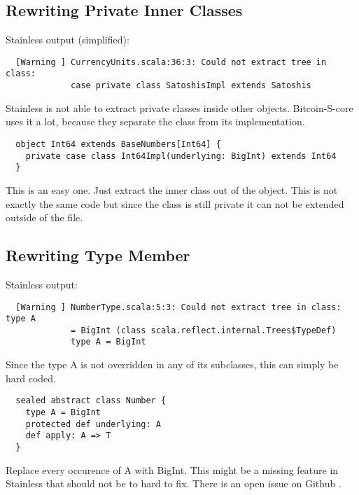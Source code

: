 \subsection{Rewriting Private Inner Classes}
Stainless output (simplified):
\begin{lstlisting}
  [Warning ] CurrencyUnits.scala:36:3: Could not extract tree in class:
             case private class SatoshisImpl extends Satoshis
\end{lstlisting}
Stainless is not able to extract private classes inside other objects.
Bitcoin-S-core uses it a lot, because they separate the class from its implementation.
\begin{lstlisting}
  object Int64 extends BaseNumbers[Int64] {
    private case class Int64Impl(underlying: BigInt) extends Int64 
  }
\end{lstlisting}
This is an easy one.
Just extract the inner class out of the object.
This is not exactly the same code but since the class is still private it can not be extended outside of the file.

\subsection{Rewriting Type Member}
Stainless output:
\begin{lstlisting}
  [Warning ] NumberType.scala:5:3: Could not extract tree in class: type A
             = BigInt (class scala.reflect.internal.Trees$TypeDef)
             type A = BigInt
\end{lstlisting}
Since the type A is not overridden in any of its subclasses, this can simply be hard coded.
\begin{lstlisting}
  sealed abstract class Number {
    type A = BigInt
    protected def underlying: A
    def apply: A => T
  }
\end{lstlisting}
Replace every occurence of A with BigInt.
This might be a missing feature in Stainless that should not be to hard to fix.
There is an open issue on Github .

